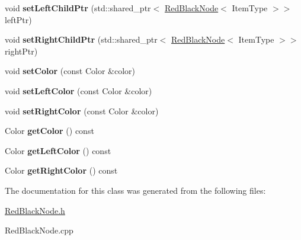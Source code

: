 \begin{DoxyCompactItemize}
\item 
void {\bfseries set\+Left\+Child\+Ptr} (std\+::shared\+\_\+ptr$<$ \hyperlink{class_red_black_node}{Red\+Black\+Node}$<$ Item\+Type $>$$>$ left\+Ptr)\hypertarget{class_red_black_node_ae158775782e253dc7638d37992326b94}{}\label{class_red_black_node_ae158775782e253dc7638d37992326b94}

\item 
void {\bfseries set\+Right\+Child\+Ptr} (std\+::shared\+\_\+ptr$<$ \hyperlink{class_red_black_node}{Red\+Black\+Node}$<$ Item\+Type $>$$>$ right\+Ptr)\hypertarget{class_red_black_node_aefe4673582908257d2d01adf70ae5992}{}\label{class_red_black_node_aefe4673582908257d2d01adf70ae5992}

\item 
void {\bfseries set\+Color} (const Color \&color)\hypertarget{class_red_black_node_af943e16bfa0230759a505684d5dff58d}{}\label{class_red_black_node_af943e16bfa0230759a505684d5dff58d}

\item 
void {\bfseries set\+Left\+Color} (const Color \&color)\hypertarget{class_red_black_node_a6d268f10aedbee84627d9723732ed6a0}{}\label{class_red_black_node_a6d268f10aedbee84627d9723732ed6a0}

\item 
void {\bfseries set\+Right\+Color} (const Color \&color)\hypertarget{class_red_black_node_ab4021b8366c38b0434702dbf72dbeb49}{}\label{class_red_black_node_ab4021b8366c38b0434702dbf72dbeb49}

\item 
Color {\bfseries get\+Color} () const \hypertarget{class_red_black_node_ae8eff9a3f8a4260f0673f216b819332a}{}\label{class_red_black_node_ae8eff9a3f8a4260f0673f216b819332a}

\item 
Color {\bfseries get\+Left\+Color} () const \hypertarget{class_red_black_node_a7a85b4a93c849a48e1e71000c9a88bbf}{}\label{class_red_black_node_a7a85b4a93c849a48e1e71000c9a88bbf}

\item 
Color {\bfseries get\+Right\+Color} () const \hypertarget{class_red_black_node_a5095c505f19acab321452cdeeb18a70a}{}\label{class_red_black_node_a5095c505f19acab321452cdeeb18a70a}

\end{DoxyCompactItemize}


The documentation for this class was generated from the following files\+:\begin{DoxyCompactItemize}
\item 
\hyperlink{_red_black_node_8h}{Red\+Black\+Node.\+h}\item 
Red\+Black\+Node.\+cpp\end{DoxyCompactItemize}
